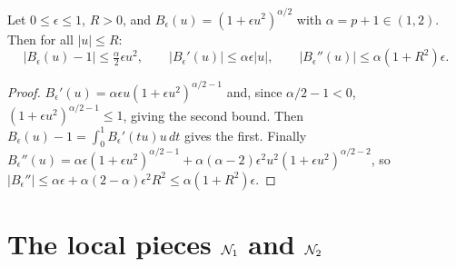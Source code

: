 \begin{lemma}
  \label{lem:c10_B_bounds}
  Let $0\le\epsilon\le1$, $R>0$, and $B_\epsilon(u)=(1+\epsilon u^2)^{\alpha/2}$ with $\alpha=p+1\in(1,2)$.
  Then for all $|u|\le R$:
  \[
    |B_\epsilon(u)-1|\le \tfrac{\alpha}{2}\epsilon u^2,\qquad |B_\epsilon'(u)|\le \alpha\epsilon|u|,\qquad
    |B_\epsilon''(u)|\le \alpha(1+R^2)\epsilon .
  \]
\end{lemma}
\begin{proof}
  $B_\epsilon'(u)=\alpha\epsilon u(1+\epsilon u^2)^{\alpha/2-1}$ and, since $\alpha/2-1<0$,
  $(1+\epsilon u^2)^{\alpha/2-1}\le1$, giving the second bound. Then
  $B_\epsilon(u)-1=\int_0^1B_\epsilon'(tu)u\,dt$ gives the first. Finally
  $B_\epsilon''(u)=\alpha\epsilon(1+\epsilon u^2)^{\alpha/2-1}+\alpha(\alpha-2)\epsilon^2u^2(1+\epsilon u^2)^{\alpha/2-2}$,
  so $|B_\epsilon''|\le\alpha\epsilon+\alpha(2-\alpha)\epsilon^2R^2\le\alpha(1+R^2)\epsilon$.
\end{proof}

\section{The local pieces $\mathcal{N}_1$ and $\mathcal{N}_2$}

